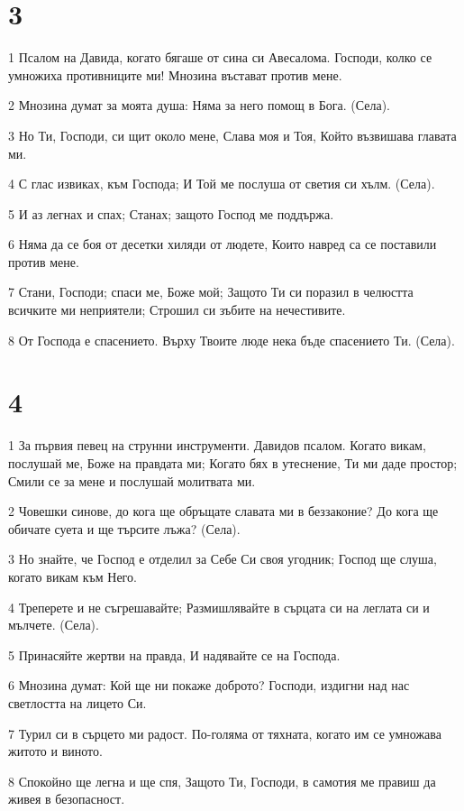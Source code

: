 \chapter{3}

\par 1 Псалом на Давида, когато бягаше от сина си Авесалома. Господи, колко се умножиха противниците ми! Мнозина въстават против мене.
\par 2 Мнозина думат за моята душа: Няма за него помощ в Бога. (Села).
\par 3 Но Ти, Господи, си щит около мене, Слава моя и Тоя, Който възвишава главата ми.
\par 4 С глас извиках, към Господа; И Той ме послуша от светия си хълм. (Села).
\par 5 И аз легнах и спах; Станах; защото Господ ме поддържа.
\par 6 Няма да се боя от десетки хиляди от людете, Които навред са се поставили против мене.
\par 7 Стани, Господи; спаси ме, Боже мой; Защото Ти си поразил в челюстта всичките ми неприятели; Строшил си зъбите на нечестивите.
\par 8 От Господа е спасението. Върху Твоите люде нека бъде спасението Ти. (Села).

\chapter{4}

\par 1 За първия певец на струнни инструменти. Давидов псалом. Когато викам, послушай ме, Боже на правдата ми; Когато бях в утеснение, Ти ми даде простор; Смили се за мене и послушай молитвата ми.
\par 2 Човешки синове, до кога ще обръщате славата ми в беззаконие? До кога ще обичате суета и ще търсите лъжа? (Села).
\par 3 Но знайте, че Господ е отделил за Себе Си своя угодник; Господ ще слуша, когато викам към Него.
\par 4 Треперете и не съгрешавайте; Размишлявайте в сърцата си на леглата си и мълчете. (Села).
\par 5 Принасяйте жертви на правда, И надявайте се на Господа.
\par 6 Мнозина думат: Кой ще ни покаже доброто? Господи, издигни над нас светлостта на лицето Си.
\par 7 Турил си в сърцето ми радост. По-голяма от тяхната, когато им се умножава житото и виното.
\par 8 Спокойно ще легна и ще спя, Защото Ти, Господи, в самотия ме правиш да живея в безопасност.


